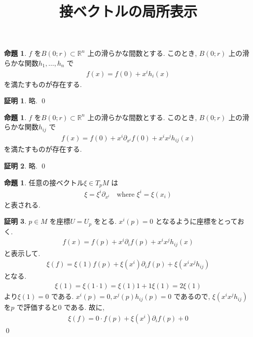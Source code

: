 \documentclass[10pt, fleqn, label-section=none]{bxjsarticle}
\title{接ベクトルの局所表示}
\date{}
\author{}
\theoremstyle{definition}
\newtheorem{prop}[dfn]{命題}
\newtheorem*{pf*}{証明}
\renewcommand{\;}{\, ; \,}
\begin{document}
\maketitle






\section{}

\begin{prop}
$f$ を$B(0; r) \subset \mathbb R^n$ 上の滑らかな間数とする. このとき, $B(0; r) $ 上の滑らかな関数$h_1, \ldots , h_n$ で
\begin{align*} f(x) = f(0) + x^i h_i (x)\end{align*}
を満たすものが存在する.
\end{prop}
\begin{pf*}
略.
\qed
\end{pf*}

\begin{prop}
$f$ を$B(0; r) \subset \mathbb R^n$ 上の滑らかな間数とする. このとき, $B(0; r) $ 上の滑らかな関数$h_{ij}$ で
\begin{align*} f(x) = f(0) + x^i \partial_{x^i}  f  (0) + x^i x^j h_{ij}(x)   \end{align*}
を満たすものが存在する.
\end{prop}
\begin{pf*}
略.
\qed
\end{pf*}


\begin{prop}
任意の接ベクトル$\xi \in T_p M$ は
\begin{align*} \xi =\xi^i \partial_{x^i} \quad \textrm{where} \,\, \xi^i = \xi (x_i)\end{align*}
と表される.
\end{prop}
\begin{pf*}
$p \in M$ を座標$U = U_p$ をとる. $x^i(p) = 0$ となるように座標をとっておく.
\begin{align*} f(x) = f(p) + x^i \partial_i f (p) + x^i x^j h_{ij} (x) \end{align*}
と表示して.
\begin{align*} \xi(f) = \xi(1) f (p) + \xi (x^i) \partial_i f (p) + \xi(x^i x^j h_{ij}) \end{align*}
となる. 
\begin{align*} \xi (1) = \xi (1 \cdot 1) = \xi (1) 1 + 1 \xi (1) = 2 \xi (1)\end{align*}
より$\xi (1) = 0$ である. $x^i(p) = 0, x^j(p)h_{ij}(p) = 0$ であるので, $\xi (x^i x^j h_{ij}) $ を$p$ で評価すると$0$ である. 故に, 
\begin{align*} \xi(f) = 0 \cdot f (p) + \xi (x^i) \partial_i f (p) + 0 \end{align*}
\qed
\end{pf*}
\end{document}
